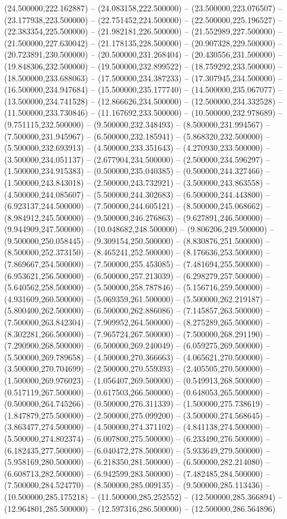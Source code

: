 (24.500000,222.162887) -- (24.083158,222.500000) -- (23.500000,223.076507) -- (23.177938,223.500000) -- (22.751452,224.500000) -- (22.500000,225.196527) -- (22.383354,225.500000) -- (21.982181,226.500000) -- (21.552989,227.500000) -- (21.500000,227.630042) -- (21.178135,228.500000) -- (20.907328,229.500000) -- (20.723891,230.500000) -- (20.500000,231.268404) -- (20.430556,231.500000) -- (19.848306,232.500000) -- (19.500000,232.899522) -- (18.759292,233.500000) -- (18.500000,233.688063) -- (17.500000,234.387233) -- (17.307945,234.500000) -- (16.500000,234.947684) -- (15.500000,235.177740) -- (14.500000,235.067077) -- (13.500000,234.741528) -- (12.866626,234.500000) -- (12.500000,234.332528) -- (11.500000,233.730846) -- (11.167692,233.500000) -- (10.500000,232.978689) -- (9.751115,232.500000) -- (9.500000,232.348493) -- (8.500000,231.994567) -- (7.500000,231.945967) -- (6.500000,232.185941) -- (5.868320,232.500000) -- (5.500000,232.693913) -- (4.500000,233.351643) -- (4.270930,233.500000) -- (3.500000,234.051137) -- (2.677904,234.500000) -- (2.500000,234.596297) -- (1.500000,234.915383) -- (0.500000,235.040385) -- (0.500000,244.327466) -- (1.500000,243.843018) -- (2.500000,243.732921) -- (3.500000,243.863558) -- (4.500000,244.085607) -- (5.500000,244.302683) -- (6.500000,244.443800) -- (6.923137,244.500000) -- (7.500000,244.605121) -- (8.500000,245.068662) -- (8.984912,245.500000) -- (9.500000,246.276863) -- (9.627891,246.500000) -- (9.944909,247.500000) -- (10.048682,248.500000) -- (9.806206,249.500000) -- (9.500000,250.058445) -- (9.309154,250.500000) -- (8.830876,251.500000) -- (8.500000,252.373150) -- (8.465241,252.500000) -- (8.176636,253.500000) -- (7.869667,254.500000) -- (7.500000,255.453085) -- (7.481694,255.500000) -- (6.953621,256.500000) -- (6.500000,257.213039) -- (6.298279,257.500000) -- (5.640562,258.500000) -- (5.500000,258.787846) -- (5.156716,259.500000) -- (4.931609,260.500000) -- (5.069359,261.500000) -- (5.500000,262.219187) -- (5.800400,262.500000) -- (6.500000,262.886086) -- (7.145857,263.500000) -- (7.500000,263.842304) -- (7.909952,264.500000) -- (8.275289,265.500000) -- (8.302281,266.500000) -- (7.965724,267.500000) -- (7.500000,268.291190) -- (7.290900,268.500000) -- (6.500000,269.240049) -- (6.059275,269.500000) -- (5.500000,269.789658) -- (4.500000,270.366663) -- (4.065621,270.500000) -- (3.500000,270.704699) -- (2.500000,270.559393) -- (2.405505,270.500000) -- (1.500000,269.976023) -- (1.056407,269.500000) -- (0.549913,268.500000) -- (0.517119,267.500000) -- (0.617503,266.500000) -- (0.648053,265.500000) -- (0.500000,264.745266) -- (0.500000,276.311339) -- (1.500000,275.738619) -- (1.847879,275.500000) -- (2.500000,275.099200) -- (3.500000,274.568645) -- (3.863477,274.500000) -- (4.500000,274.371102) -- (4.841138,274.500000) -- (5.500000,274.802374) -- (6.007800,275.500000) -- (6.233490,276.500000) -- (6.182435,277.500000) -- (6.040472,278.500000) -- (5.933649,279.500000) -- (5.958169,280.500000) -- (6.218350,281.500000) -- (6.500000,282.214080) -- (6.608713,282.500000) -- (6.942599,283.500000) -- (7.482485,284.500000) -- (7.500000,284.524770) -- (8.500000,285.009135) -- (9.500000,285.113436) -- (10.500000,285.175218) -- (11.500000,285.252552) -- (12.500000,285.366894) -- (12.964801,285.500000) -- (12.597316,286.500000) -- (12.500000,286.564896) 